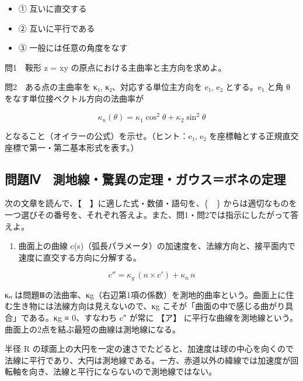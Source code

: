 \documentclass[
  10pt,
  a4paper,
]{article}
\providecommand{\tightlist}{%
  \setlength{\itemsep}{0pt}\setlength{\parskip}{0pt}}
\begin{document}
\begin{itemize}
\tightlist
\item
  ① 互いに直交する
\item
  ② 互いに平行である
\item
  ③ 一般には任意の角度をなす
\end{itemize}

問1　鞍形 z = xy の原点における主曲率と主方向を求めよ。

問2　ある点の主曲率を κ{\fallbackfont ₁},
κ{\fallbackfont ₂}、対応する単位主方向を e{\fallbackfont ₁},
e{\fallbackfont ₂} とする。e{\fallbackfont ₁} と角 θ
をなす単位接ベクトル方向の法曲率が

\[\kappa_n(\theta) = \kappa_1 \cos^2\theta + \kappa_2 \sin^2\theta\]

となること（オイラーの公式）を示せ。（ヒント：e{\fallbackfont ₁},
e{\fallbackfont ₂}
を座標軸とする正規直交座標で第一・第二基本形式を表す。）

\hypertarget{ux554fux984cux2173-ux6e2cux5730ux7ddaux9a5aux7570ux306eux5b9aux7406ux30acux30a6ux30b9ux30dcux30cdux306eux5b9aux7406}{%
\subsection{問題Ⅳ　測地線・驚異の定理・ガウス＝ボネの定理}\label{ux554fux984cux2173-ux6e2cux5730ux7ddaux9a5aux7570ux306eux5b9aux7406ux30acux30a6ux30b9ux30dcux30cdux306eux5b9aux7406}}

次の文章を読んで、【　】に適した式・数値・語句を、\{　\}
からは適切なものを一つ選びその番号を、それぞれ答えよ。また、問1・問2では指示にしたがって答えよ。

\begin{enumerate}
\def\labelenumi{(\arabic{enumi})}
\tightlist
\item
  曲面上の曲線
  c(s)（弧長パラメータ）の加速度を、法線方向と、接平面内で速度に直交する方向に分解する。
\end{enumerate}

\[c'' = \kappa_g\, (n \times c') + \kappa_n\, n\]

κ{\fallbackfont ₙ}
は問題Ⅲの法曲率、κg（右辺第1項の係数）を測地的曲率という。曲面上に住む生き物には法線方向は見えないので、κg
こそが「曲面の中で感じる曲がり具合」である。κg ≡ 0、すなわち c″ が常に
【ア】
に平行な曲線を測地線という。曲面上の2点を結ぶ最短の曲線は測地線になる。

半径 R
の球面上の大円を一定の速さでたどると、加速度は球の中心を向くので法線に平行であり、大円は測地線である。一方、赤道以外の緯線では加速度が回転軸を向き、法線と平行にならないので測地線ではない。
\end{document}
